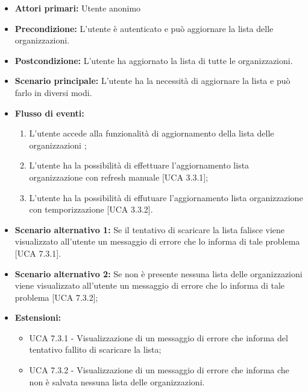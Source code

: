 \begin{itemize} 
	\item \textbf{Attori primari:} Utente anonimo
	\item \textbf{Precondizione:} L'utente è autenticato e può aggiornare la lista delle organizzazioni.
	\item \textbf{Postcondizione:} L'utente ha aggiornato la lista di tutte le organizzazioni.
	\item \textbf{Scenario principale:} L'utente ha la necessità di aggiornare la lista e può farlo in diversi modi.
	\item \textbf{Flusso di eventi:}
	\begin{enumerate}
		\item L'utente accede alla funzionalità di aggiornamento della lista delle organizzazioni ;
		\item L'utente ha la possibilità di effettuare l'aggiornamento lista organizzazione con refresh manuale [UCA 3.3.1];
		\item L'utente ha la possibilità di effutuare l'aggiornamento lista organizzazione con temporizzazione [UCA 3.3.2].
	\end{enumerate}
	\item \textbf{Scenario alternativo 1:} Se il tentativo di scaricare la lista falisce viene visualizzato all'utente un messaggio di errore che lo informa di tale problema [UCA 7.3.1].
	\item \textbf{Scenario alternativo 2:} Se non è presente nessuna lista delle organizzazioni viene visualizzato all'utente un messaggio di errore che lo informa di tale problema [UCA 7.3.2];
	\item \textbf{Estensioni:}
	\begin{itemize}
		\item UCA 7.3.1 - Visualizzazione di un messaggio di errore che informa del tentativo fallito di scaricare la lista;
		\item UCA 7.3.2 - Visualizzazione di un messaggio di errore che informa che non è salvata nessuna lista delle organizzazioni.
	\end{itemize}
\end{itemize}

